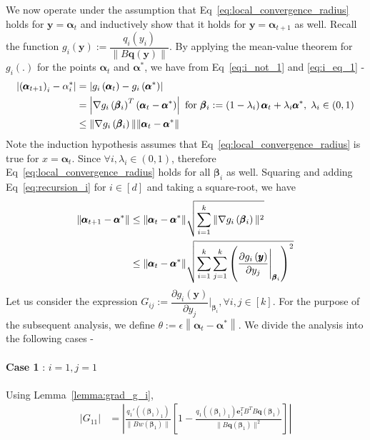 \documentclass[letterpaper]{article}
\newcommand{\ba}[1]{\begin{align}#1\end{align}}
\newcommand{\bas}[1]{\begin{align*}#1\end{align*}}
\newcommand{\balpha}{\pmb{\alpha}}
\newcommand{\by}{\pmb{y}}
\newcommand{\be}{\pmb{e}}
\newcommand{\bbeta}{\pmb{\beta}}
\newcommand{\bq}{\pmb{q}}
\newcommand{\bb}[1]{\left(#1\right)}
\newcommand{\bbb}[1]{\left[#1\right]}
\begin{document}
We now operate under the assumption that Eq~\ref{eq:local_convergence_radius} holds for $\by = \balpha_{t}$ and inductively show that it holds for $\by = \balpha_{t+1}$ as well. 
Recall the function $g_{i}\bb{\by} := \dfrac{q_{i}\bb{y_{i}}}{\|B\bm{q}\bb{\by}\|}$. By applying the mean-value theorem for $g_{i}\bb{.}$ for the points $\balpha_{t}$ and $\balpha^{*}$, we have from Eq~\ref{eq:i_not_1} and \ref{eq:i_eq_1} -
\ba{
    \left|\bb{\balpha_{t+1}}_{i} - \alpha^{*}_{i}\right| &= \left|g_{i}\bb{\balpha_{t}} - g_{i}\bb{\balpha^{*}}\right| \notag \\ 
    &= \left|\nabla g_{i}\bb{\bbeta_{i}}^{T}\bb{\balpha_{t} - \balpha^{*}}\right| \text{ for } \bbeta_{i} := \bb{1-\lambda_{i}}\balpha_{t} + \lambda_{i}\balpha^{*}, \; \lambda_{i} \in \bb{0,1} \notag \\
    &\leq \|\nabla g_{i}\bb{\bbeta_{i}}\|\|\balpha_{t}-\balpha^{*}\|
    \label{eq:recursion_i}
}
Note the induction hypothesis assumes that Eq~\ref{eq:local_convergence_radius} is true for $x = \balpha_{t}$. Since $\forall i, \lambda_{i} \in \bb{0,1}$, therefore Eq~\ref{eq:local_convergence_radius} holds for all $\bbeta_{i}$ as well.
Squaring and adding Eq~\ref{eq:recursion_i} for $i \in [d]$ and taking a square-root, we have
\ba{
    \|\balpha_{t+1}-\balpha^{*}\| &\leq \|\balpha_{t}-\balpha^{*}\|\sqrt{\sum_{i=1}^{k}\|\nabla g_{i}\bb{\bbeta_{i}}\|^{2}} \notag \\ 
    &\leq \|\balpha_{t}-\balpha^{*}\|\sqrt{\sum_{i=1}^{k}\sum_{j=1}^{k}\bb{\frac{\partial g_{i}\bb{\by}}{\partial y_{j}}\Bigg|_{\bbeta_{i}}}^{2}} \label{eq:vector_recursion}
}
Let us consider the expression $G_{ij} := \dfrac{\partial g_{i}\bb{\by}}{\partial y_{j}}\Bigg|_{\bbeta_{i}}, \forall i,j \in [k]$. For the purpose of the subsequent analysis, we define $\theta := \epsilon\left\|\balpha_{t}-\balpha^{*}\right\|$. We divide the analysis into the following cases -
\\ \\
\textbf{Case 1} : $i=1, j=1$ 
\\ \\
Using Lemma~\ref{lemma:grad_g_i}, 
\bas{
    \left|G_{11}\right| &= \left|\frac{q_{1}'\bb{\bb{\bbeta_{1}}_{1}}}{\|Bw\bb{\bbeta_{1}}\|}\bbb{1 - \frac{q_{1}\bb{\bb{\bbeta_{1}}_{1}}\be_{1}^{T}B^{T}B\bq\bb{\bbeta_{1}}}{\|B\bq\bb{\bbeta_{1}}\|^{2}}}\right|
}
\end{document}
